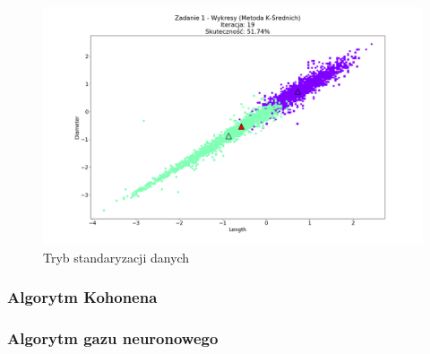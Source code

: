 \documentclass{classrep}
\begin{document}
{{{				\begin{figure}[!htbp]
					\centering
					\includegraphics[width=\textwidth,width=95mm]{wykresy/plot_k_meansAbaloneStandardise.png}
					\caption{Tryb standaryzacji danych}
				\end{figure}
			\FloatBarrier
		}

		\subsubsection{Algorytm Kohonena}
		{

		}

		\subsubsection{Algorytm gazu neuronowego}
		{

		}
	}
}
\end{document}
